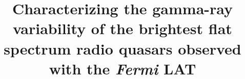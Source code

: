 \documentclass[twocolumn,linenumbers]{aastex62}
\begin{document}
\title{Characterizing the gamma-ray variability of the brightest flat spectrum radio quasars observed with the \emph{Fermi} LAT}


\end{document}
